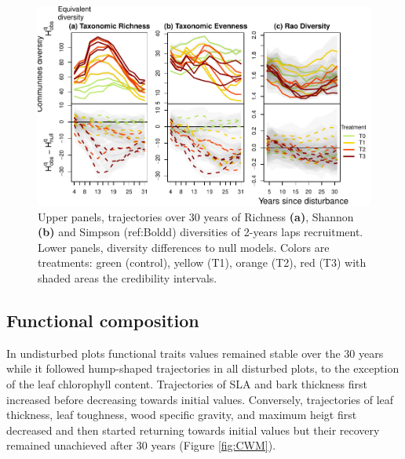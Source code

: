\documentclass[fleqn,10pt]{ArtEcoFoG} %
\begin{document}
\begin{figure}

{\centering \includegraphics{RecruitmentTrajectories_files/figure-latex/DivTraj-1} 

}

\caption{Upper panels, trajectories over 30 years of Richness \textbf{(a)}, Shannon \textbf{(b)} and Simpson (ref:Boldd) diversities of 2-years laps recruitment. Lower panels, diversity differences to null models. Colors are treatments: green (control), yellow (T1), orange (T2), red (T3) with shaded areas the credibility intervals.}\label{fig:DivTraj}
\end{figure}

\subsection{Functional composition}\label{functional-composition}

In undisturbed plots functional traits values remained stable over the
30 years while it followed hump-shaped trajectories in all disturbed
plots, to the exception of the leaf chlorophyll content. Trajectories of
SLA and bark thickness first increased before decreasing towards initial
values. Conversely, trajectories of leaf thickness, leaf toughness, wood
specific gravity, and maximum heigt first decreased and then started
returning towards initial values but their recovery remained unachieved
after 30 years (Figure \ref{fig:CWM}).
\end{document}
